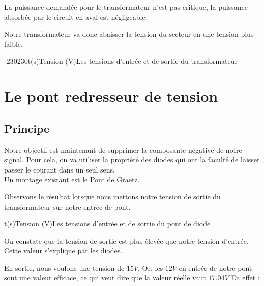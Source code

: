   La puissance demandée pour le transformateur n'est pas critique, la puissance absorbée par le circuit en aval est négligeable.

  Notre transformateur va donc abaisser la tension du secteur en une tension plus faible.

  \begin{graphicFigure}{0.6}{0.6}{0}{0.08}{-230}{230}{t(s)}{Tension (V)}{Les tensions d'entrée et de sortie du transformateur}
    \end{graphicFigure}

    \newpage 
  \section{Le pont redresseur de tension}

  \subsection{Principe}
  Notre objectif est maintenant de supprimer la composante négative de notre signal. Pour cela, on va utiliser la propriété des diodes qui ont la faculté de laisser passer le courant dans un seul sens.\\
  Un montage existant est le Pont de Graetz.


  Observons le résultat lorsque nous mettons notre tension de sortie du transformateur sur notre entrée de pont.

  \begin{graphicFigure}{0.6}{0.6}{0}{0.08}{-20}{20}{t(s)}{Tension (V)}{Les tensions d'entrée et de sortie du pont de diode}
    \end{graphicFigure}

  On constate que la tension de sortie est plus élevée que notre tension d'entrée.\\
  Cette valeur s'explique par les diodes. 
  
  En sortie, nous voulons une tension de $15V$. Or, les $12V$ en entrée de notre pont sont une valeur efficace, ce qui veut dire que la valeur réelle vaut $17.04V$
    En effet : 

